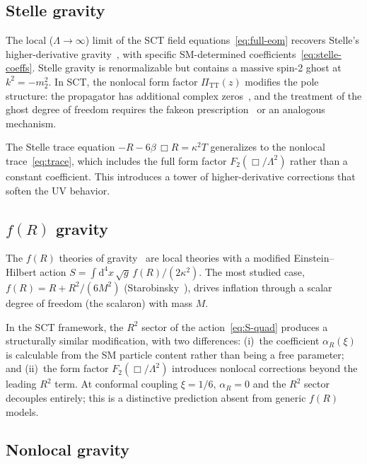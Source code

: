 \documentclass[12pt,a4paper]{article}
\newcommand{\dd}{\mathrm{d}}
\newcommand{\PiTT}{\Pi_{\mathrm{TT}}}
\newcommand{\Lam}{\Lambda}
\theoremstyle{plain}
\theoremstyle{definition}
\begin{document}
\subsection{Stelle gravity}

The local ($\Lam \to \infty$) limit of the SCT field
equations~\eqref{eq:full-eom} recovers Stelle's higher-derivative
gravity~\cite{Stelle:1976gc,Stelle:1978}, with specific SM-determined
coefficients~\eqref{eq:stelle-coeffs}.  Stelle gravity is renormalizable
but contains a massive spin-2 ghost at $k^2 = -m_2^2$.  In SCT, the
nonlocal form factor $\PiTT(z)$ modifies the pole structure:
the propagator has additional complex
zeros~\cite{Alfyorov:2026ff,Biswas:2011ar}, and the treatment of the
ghost degree of freedom requires the fakeon
prescription~\cite{Calcagni:2018gke} or an analogous mechanism.

The Stelle trace equation $-R - 6\beta\,\Box R = \kappa^2 T$ generalizes
to the nonlocal trace~\eqref{eq:trace}, which includes the full form factor
$F_2(\Box/\Lam^2)$ rather than a constant coefficient.  This introduces
a tower of higher-derivative corrections that soften the UV behavior.

\subsection{\texorpdfstring{$f(R)$}{f(R)} gravity}

The $f(R)$ theories of gravity~\cite{Sotiriou:2008rp,DeFelice:2010aj}
are local theories with a modified Einstein--Hilbert action
$S = \int \dd^4x\,\sqrt{g}\,f(R)/(2\kappa^2)$.  The most studied case,
$f(R) = R + R^2/(6M^2)$ (Starobinsky~\cite{Starobinsky:1980te}), drives
inflation through a scalar degree of freedom (the scalaron) with mass $M$.

In the SCT framework, the $R^2$ sector of the action~\eqref{eq:S-quad}
produces a structurally similar modification, with two differences:
(i)~the coefficient $\alpha_R(\xi)$ is calculable from the SM particle
content rather than being a free parameter; and (ii)~the form factor
$F_2(\Box/\Lam^2)$ introduces nonlocal corrections beyond the leading
$R^2$ term.  At conformal coupling $\xi = 1/6$, $\alpha_R = 0$ and the
$R^2$ sector decouples entirely; this is a distinctive prediction absent
from generic $f(R)$ models.

\subsection{Nonlocal gravity}
\end{document}
